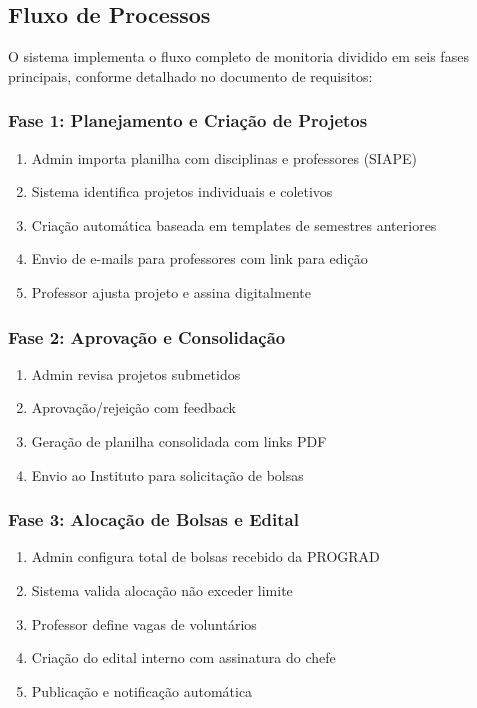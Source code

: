 \documentclass[portuguese]{sbc2025}%
\begin{document}
\subsection{Fluxo de Processos}

O sistema implementa o fluxo completo de monitoria dividido em seis fases principais, conforme detalhado no documento de requisitos:

\subsubsection{Fase 1: Planejamento e Criação de Projetos}

\begin{enumerate}
  \item Admin importa planilha com disciplinas e professores (SIAPE)
  \item Sistema identifica projetos individuais e coletivos
  \item Criação automática baseada em templates de semestres anteriores
  \item Envio de e-mails para professores com link para edição
  \item Professor ajusta projeto e assina digitalmente
\end{enumerate}

\subsubsection{Fase 2: Aprovação e Consolidação}

\begin{enumerate}
  \item Admin revisa projetos submetidos
  \item Aprovação/rejeição com feedback
  \item Geração de planilha consolidada com links PDF
  \item Envio ao Instituto para solicitação de bolsas
\end{enumerate}

\subsubsection{Fase 3: Alocação de Bolsas e Edital}

\begin{enumerate}
  \item Admin configura total de bolsas recebido da PROGRAD
  \item Sistema valida alocação não exceder limite
  \item Professor define vagas de voluntários
  \item Criação do edital interno com assinatura do chefe
  \item Publicação e notificação automática
\end{enumerate}
\end{document}
